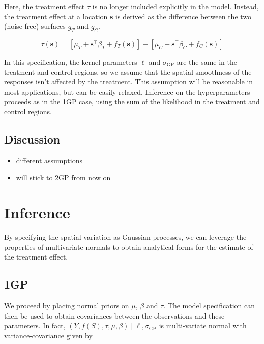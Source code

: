 \documentclass[letter]{article}
\providecommand{\tightlist}{%
      \setlength{\itemsep}{0pt}\setlength{\parskip}{0pt}}
\newcommand{\genericdel}[3]{%
      \left#1#3\right#2
    }
\newcommand{\del}[1]{\genericdel(){#1}}
\newcommand{\sbr}[1]{\genericdel[]{#1}}
\newcommand{\trans}{^{\intercal}}
\newcommand{\sigmaf}{\sigma_{\mathrm{GP}}}
\newcommand{\svec}{\mathbf{s}}
\providecommand{\tightlist}{%
  	  \setlength{\itemsep}{0pt}\setlength{\parskip}{0pt}}
\begin{document}
Here, the treatment effect \(\tau\) is no longer included explicitly in
the model. Instead, the treatment effect at a location \(\svec\) is
derived as the difference between the two (noise-free) surfaces \(g_T\)
and \(g_C\).

\begin{equation}
\tau(\svec) = \sbr{\mu_T + \svec\trans\beta_T + f_T(\svec)} - \sbr{\mu_C + \svec\trans\beta_C + f_C(\svec)}
\end{equation}

In this specification, the kernel parameters \(\ell\) and \(\sigmaf\)
are the same in the treatment and control regions, so we assume that the
spatial smoothness of the responses isn't affected by the treatment.
This assumption will be reasonable in most applications, but can be
easily relaxed. Inference on the hyperparameters proceeds as in the 1GP
case, using the sum of the likelihood in the treatment and control
regions.

\subsection{Discussion}\label{discussion}

\begin{itemize}
\tightlist
\item
  different assumptions
\item
  will stick to 2GP from now on
\end{itemize}
    


    	\section{Inference}\label{inference}

By specifying the spatial variation as Gaussian processes, we can
leverage the properties of multivariate normals to obtain analytical
forms for the estimate of the treatment effect.
    


    	\subsection{1GP}\label{gp}

We proceed by placing normal priors on \(\mu\), \(\beta\) and \(\tau\).
The model specification can then be used to obtain covariances between
the observations and these parameters. In fact,
\(\del{Y,f(S),\tau,\mu,\beta} \mid \ell,\sigmaf\) is multi-variate
normal with variance-covariance given by
\end{document}
